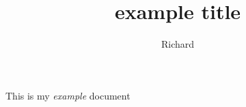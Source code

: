 \documentclass[a4paper]{report}
\title{example title}
\author{Richard}
\begin{document}
\maketitle
This is my \textit{example} document
\end{document}
